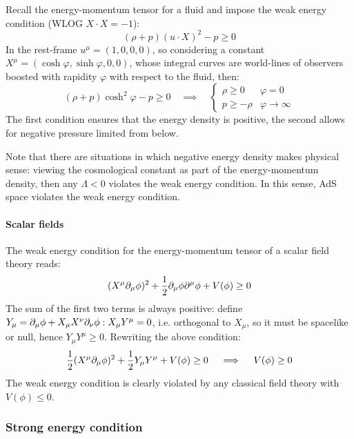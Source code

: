 Recall the energy-momentum tensor for a fluid  and impose the weak energy condition (WLOG $ X \cdot X = -1 $):
\begin{equation*}
  (\rho + p) (u \cdot X)^2 - p \ge 0
\end{equation*}
In the rest-frame $ u^\mu = (1,0,0,0) $, so considering a constant $ X^\mu = (\cosh \varphi, \sinh \varphi, 0, 0) $, whose integral curves are world-lines of observers boosted with rapidity $ \varphi $ with respect to the fluid, then:
\begin{equation*}
  (\rho + p) \cosh^2 \varphi - p \ge 0
  \quad \implies \quad
  \begin{cases}
    \rho \ge 0 & \varphi = 0 \\
    p \ge -\rho & \varphi \rightarrow \infty
  \end{cases}
\end{equation*}
The first condition ensures that the energy density is positive, the second allows for negative pressure limited from below.

Note that there are situations in which negative energy density makes physical sense: viewing the cosmological constant as part of the energy-momentum density, then any $ \Lambda < 0 $ violates the weak energy condition. In this sense, AdS space violates the weak energy condition.

\paragraph{Scalar fields}

The weak energy condition for the energy-momentum tensor of a scalar field theory  reads:
\begin{equation*}
  (X^\mu \partial_\mu \phi)^2 + \frac{1}{2} \partial_\mu \phi \partial^\mu \phi + V(\phi) \ge 0
\end{equation*}
The sum of the first two terms is always positive: define $ Y_\mu = \partial_\mu \phi + X_\mu X^\nu \partial_\nu \phi : X_\mu Y^\mu = 0 $, i.e. orthogonal to $ X_\mu $, so it must be spacelike or null, hence $ Y_\mu Y^\mu \ge 0 $. Rewriting the above condition:
\begin{equation*}
  \frac{1}{2} (X^\mu \partial_\mu \phi)^2 + \frac{1}{2} Y_\mu Y^\mu + V(\phi) \ge 0
  \quad \implies \quad
  V(\phi) \ge 0
\end{equation*}
The weak energy condition is clearly violated by any classical field theory with $ V(\phi) \le 0 $.

\subsubsection{Strong energy condition}

